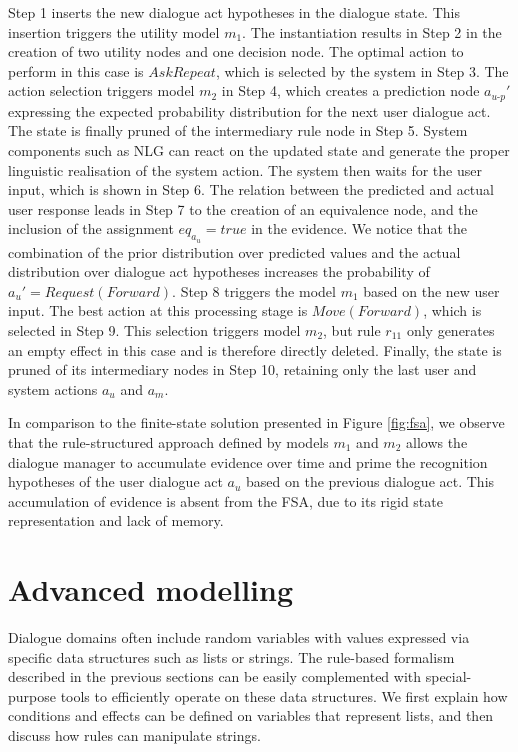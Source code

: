 Step 1 inserts the new dialogue act hypotheses in the dialogue state.  This insertion triggers 
the utility model $m_1$. The instantiation results in Step 2 in the creation of two utility nodes and one decision node.  The optimal action to perform in this case is $\mathit{AskRepeat}$, which is selected by the system in Step 3. The action selection triggers model $m_2$ in Step 4, which creates a prediction node $a_{u\mbox{-}p}'$ expressing the expected probability distribution for the next user dialogue act. The state is finally pruned of the intermediary rule node in Step 5.  System components such as NLG can react on the updated state and generate the proper linguistic realisation of the system action. The system then waits for the user input, which is shown in Step 6.  The relation between the predicted and actual user response leads in Step 7 to the creation of an equivalence node, and the inclusion of the assignment $eq_{a_u} = true$ in the evidence. We notice that the combination of the prior distribution over predicted values and the actual distribution over dialogue act hypotheses increases the probability of $a_u' = \mathit{Request(Forward)}$. Step 8 triggers the model $m_1$ based on the new user input.  The best action at this processing stage is $\mathit{Move(Forward)}$, which is selected in Step 9.  This selection triggers model $m_2$, but rule $r_{11}$ only generates an empty effect in this case and is therefore directly deleted. Finally, the state is pruned of its intermediary nodes in Step 10, retaining only the last user and system actions $a_u$ and $a_m$. 

In comparison to the finite-state solution presented in Figure \ref{fig:fsa}, we observe that the rule-structured approach defined by models $m_1$ and $m_2$ allows the dialogue manager to accumulate evidence over time and prime the recognition hypotheses of the user dialogue act $a_u$ based on the previous dialogue act.  This accumulation of evidence is absent from the FSA, due to its rigid state representation and lack of memory. 

\section{Advanced modelling}
\label{sec:amodelling}

Dialogue domains often include random variables with values expressed via specific data structures such as lists or strings. The rule-based formalism described in the previous sections can be easily complemented with special-purpose tools to efficiently operate on these data structures. We first explain how conditions and effects can be defined on variables that represent lists, and then discuss how rules can manipulate strings. 

